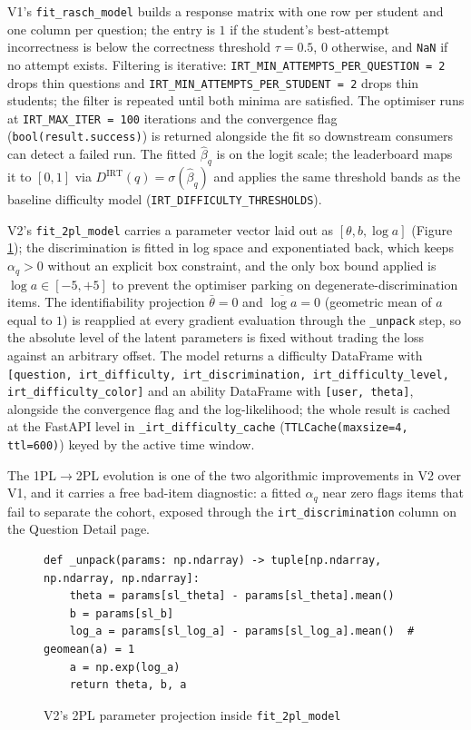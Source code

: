 V1's \texttt{fit\_rasch\_model} builds a response matrix with one row per student and one column per question; the entry is $1$ if the student's best-attempt incorrectness is below the correctness threshold $\tau = 0.5$, $0$ otherwise, and \texttt{NaN} if no attempt exists.
Filtering is iterative: \texttt{IRT\_MIN\_ATTEMPTS\_PER\_QUESTION = 2} drops thin questions and \texttt{IRT\_MIN\_ATTEMPTS\_PER\_STUDENT = 2} drops thin students; the filter is repeated until both minima are satisfied.
The optimiser runs at \texttt{IRT\_MAX\_ITER = 100} iterations and the convergence flag (\texttt{bool(result.success)}) is returned alongside the fit so downstream consumers can detect a failed run.
The fitted $\hat{\beta}_q$ is on the logit scale; the leaderboard maps it to $[0, 1]$ via $D^{\mathrm{IRT}}(q) = \sigma(\hat{\beta}_q)$ and applies the same threshold bands as the baseline difficulty model (\texttt{IRT\_DIFFICULTY\_THRESHOLDS}).

V2's \texttt{fit\_2pl\_model} carries a parameter vector laid out as $[\theta, b, \log a]$ (Figure \ref{fig:code-2pl-unpack}); the discrimination is fitted in log space and exponentiated back, which keeps $\alpha_q > 0$ without an explicit box constraint, and the only box bound applied is $\log a \in [-5, +5]$ to prevent the optimiser parking on degenerate-discrimination items.
The identifiability projection $\bar{\theta} = 0$ and $\overline{\log a} = 0$ (geometric mean of $a$ equal to $1$) is reapplied at every gradient evaluation through the \texttt{\_unpack} step, so the absolute level of the latent parameters is fixed without trading the loss against an arbitrary offset.
The model returns a difficulty DataFrame with \texttt{[question, irt\_difficulty, irt\_discrimination, irt\_difficulty\_level, irt\_difficulty\_color]} and an ability DataFrame with \texttt{[user, theta]}, alongside the convergence flag and the log-likelihood; the whole result is cached at the FastAPI level in \texttt{\_irt\_difficulty\_cache} (\texttt{TTLCache(maxsize=4, ttl=600)}) keyed by the active time window.

The 1PL$\rightarrow$2PL evolution is one of the two algorithmic improvements in V2 over V1, and it carries a free bad-item diagnostic: a fitted $\alpha_q$ near zero flags items that fail to separate the cohort, exposed through the \texttt{irt\_discrimination} column on the Question Detail page.

\begin{figure}[H]
    \centering
    \begin{minipage}{0.92\linewidth}
\begin{lstlisting}[firstnumber=191]
def _unpack(params: np.ndarray) -> tuple[np.ndarray, np.ndarray, np.ndarray]:
    theta = params[sl_theta] - params[sl_theta].mean()
    b = params[sl_b]
    log_a = params[sl_log_a] - params[sl_log_a].mean()  # geomean(a) = 1
    a = np.exp(log_a)
    return theta, b, a
\end{lstlisting}
    \end{minipage}
    \caption{V2's 2PL parameter projection inside \texttt{fit\_2pl\_model}}
    \label{fig:code-2pl-unpack}
\end{figure}

